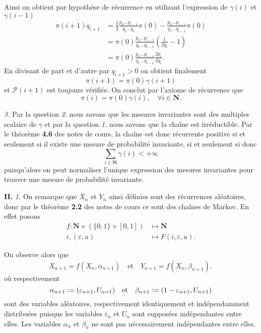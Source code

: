 \documentclass[12pt]{article}
\newcommand{\defeq}{\vcentcolon=}
\newcommand{\N}{\mathbf{N}}
\begin{document}
Ainsi on obtient par hypothèse de récurrence en utilisant l'expression de $\gamma(i)$ et $\gamma(i-1)$
\begin{align*}
        \pi(i+1)q_{i+1} &= \frac{1}{2}\frac{p_{0}\ldots p_{i-1}}{q_{1}\ldots q_{i}} \pi(0) - \frac{p_{0}\ldots p_{i-1}}{q_{1}\ldots q_{i-1}}\pi(0) \\
                        &= \pi(0)\frac{p_{0}\ldots p_{i-1}}{q_{1}\ldots q_{i-1}}(\frac{1}{2q_{i}}-1) \\
                        &= \pi(0)\frac{p_{0}\ldots p_{i-1}}{q_{1}\ldots q_{i-1}} \frac{2p_{i}}{2q_{i}} 
.\end{align*}
En divisant de part et d'autre par $q_{i+1} > 0$ on obtient finalement \[
        \pi(i+1) = \pi(0)\gamma(i+1)
\] et $\mathcal{P}(i+1)$ est toujours vérifiée. On conclut par l'axiome de récurrence que \[
\pi(i) = \pi(0)\gamma(i), \quad \forall i \in \N
.\]  

\medskip

\textit{3.} Par la question \textit{2.} nous savons que les mesures invariantes sont des multiples scalaire de $\gamma$ et par la question \textit{1.} nous savons que la chaîne est irréductible. Par le théorème \textbf{4.6} des notes de cours, la chaîne est donc récurrente positive si et seulement si il existe une mesure de probabilité invariante, si et seulement si donc  \[
        \sum_{i \in \N} \gamma(i) < +\infty
\] puisqu'alors on peut normaliser l'unique expression des mesures invariantes pour trouver une mesure de probabilité invariante. 

\bigskip

\textbf{II.} \textit{1.} On remarque que $X_{n}$ et $Y_{n}$ ainsi définies sont des récurrences aléatoires, donc par le théorème \textbf{2.2} des notes de cours ce sont des chaînes de Markov. En effet posons 
\begin{align*}
        f : \N \times (\{0,1\} \times [0,1]) &\longmapsto \N \\
        i, (\varepsilon, u) &\longmapsto F(i, \varepsilon, u)
.\end{align*}

On observe alors que \[
        X_{n+1} = f(X_{n}, \alpha_{n+1}) \quad \text{et} \quad Y_{n+1} = f(X_{n}, \beta_{n+1})
,\] où respectivement \[
\alpha_{n+1} \defeq (\varepsilon_{n+1}, U_{n=1}) \quad \text{et} \quad \beta_{n+1} \defeq (1-\varepsilon_{n+1}, U_{n+1})
\] sont des variables aléatoires, respectivement identiquement et indépendamment distribuées puisque les variables $\varepsilon_{n}$ et $U_{n}$ sont supposées indépendantes entre elles. Les variables $\alpha_{n}$ et $\beta_{n}$ ne sont pas nécessairement indépendantes entre elles.
\end{document}
